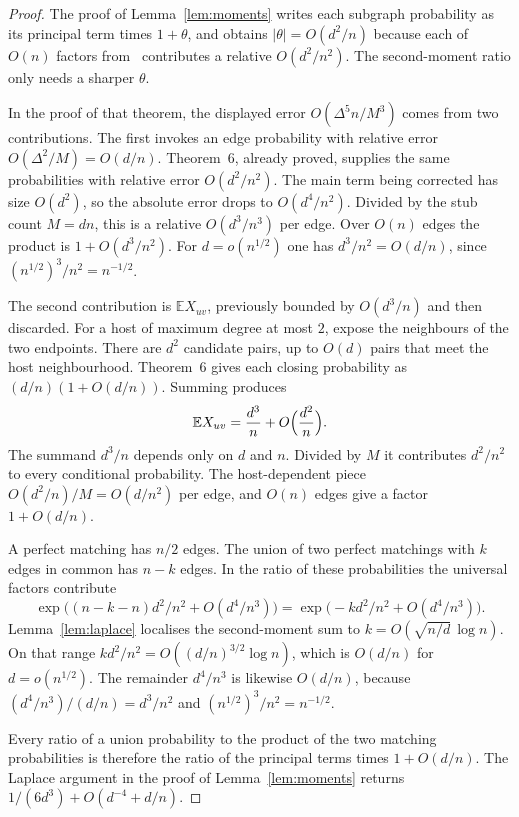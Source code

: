 \documentclass[11pt]{article}
\newcommand{\EE}{\mathbb{E}}
\begin{document}
\begin{proof}
The proof of Lemma~\ref{lem:moments} writes each subgraph probability as its
principal term times \(1+\theta\), and obtains \(|\theta|=O(d^2/n)\) because each of
\(O(n)\) factors from~\cite[Theorem~6]{Gao20} contributes a relative
\(O(d^2/n^2)\). The second-moment ratio only needs a sharper \(\theta\).

In the proof of that theorem, the displayed error \(O(\Delta^5 n/M^3)\) comes from
two contributions. The first invokes an edge probability with relative error
\(O(\Delta^2/M)=O(d/n)\). Theorem~6, already proved, supplies the same
probabilities with relative error \(O(d^2/n^2)\). The main term being corrected
has size \(O(d^2)\), so the absolute error drops to \(O(d^4/n^2)\). Divided by the
stub count \(M=dn\), this is a relative \(O(d^3/n^3)\) per edge. Over \(O(n)\)
edges the product is \(1+O(d^3/n^2)\). For \(d=o(n^{1/2})\) one has
\(d^3/n^2=O(d/n)\), since \((n^{1/2})^3/n^2=n^{-1/2}\).

The second contribution is \(\EE X_{uv}\), previously bounded by \(O(d^3/n)\) and
then discarded. For a host of maximum degree at most \(2\), expose the neighbours
of the two endpoints. There are \(d^2\) candidate pairs, up to \(O(d)\) pairs that
meet the host neighbourhood. Theorem~6 gives each closing probability as
\((d/n)(1+O(d/n))\). Summing produces
\[
\EE X_{uv}=\frac{d^3}{n}+O\Bigl(\frac{d^2}{n}\Bigr).
\]
The summand \(d^3/n\) depends only on \(d\) and \(n\). Divided by \(M\) it
contributes \(d^2/n^2\) to every conditional probability. The host-dependent piece
\(O(d^2/n)/M=O(d/n^2)\) per edge, and \(O(n)\) edges give a factor \(1+O(d/n)\).

A perfect matching has \(n/2\) edges. The union of two perfect matchings with
\(k\) edges in common has \(n-k\) edges. In the ratio of these probabilities the
universal factors contribute
\[
\exp\bigl((n-k-n)d^2/n^2+O(d^4/n^3)\bigr)
=
\exp\bigl(-kd^2/n^2+O(d^4/n^3)\bigr).
\]
Lemma~\ref{lem:laplace} localises the second-moment sum to
\(k=O(\sqrt{n/d}\,\log n)\). On that range
\(kd^2/n^2=O((d/n)^{3/2}\log n)\), which is \(O(d/n)\) for \(d=o(n^{1/2})\).
The remainder \(d^4/n^3\) is likewise \(O(d/n)\), because
\((d^4/n^3)/(d/n)=d^3/n^2\) and \((n^{1/2})^3/n^2=n^{-1/2}\).

Every ratio of a union probability to the product of the two matching
probabilities is therefore the ratio of the principal terms times \(1+O(d/n)\).
The Laplace argument in the proof of Lemma~\ref{lem:moments} returns
\(1/(6d^3)+O(d^{-4}+d/n)\).
\end{proof}
\end{document}

